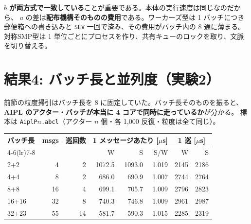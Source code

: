 \documentclass[a4paper,11pt]{ltjsarticle}
\begin{document}
\textbf{$b$ が両方式で一致している}ことが重要である。本体の実行速度は同じなのだから、
$a$ の差は\textbf{配布機構そのものの費用}である。ワーカーズ型は 1 バッチにつき
郵便箱への書き込みと \texttt{SEV} 一回で済み、その費用がバッチ内の 8 通に薄まる。
対称SMP型は 1 単位ごとにプロセスを作り、共有キューのロックを取り、文脈を切り替える。


\section{結果4: バッチ長と並列度（実験2）}\label{sec:exp2}

\begin{center}\end{center}


前節の粒度掃引はバッチ長を 8 に固定していた。バッチ長そのものを振ると、
\textbf{AIPL のアクター・バッチが本当に 4 コアで同時に走っているか}が分かる。
標本は \texttt{AiplP$n$.abcl}（アクター $n$ 個・各 1{,}000 反復・粒度は全て同じ）。

\begin{center}
\begin{tabular}{lrrrrrrr}
\toprule
バッチ長 & msgs & 巡回数 & \multicolumn{3}{c}{1 メッセージあたり [$\mu$s]} & \multicolumn{2}{c}{1 巡 [$\mu$s]} \\
\cmidrule(lr){4-6}\cmidrule(lr){7-8}
 & & & W & S & S/W & W & S \\
\midrule
2+2 & 4 & 2 & 1072.5 & 1093.0 & 1.019 & 2145 & 2186 \\%
4+4 & 8 & 2 & 686.0 & 690.9 & 1.007 & 2744 & 2764 \\%
8+8 & 16 & 4 & 699.1 & 705.7 & 1.009 & 2796 & 2823 \\%
16+16 & 32 & 8 & 740.3 & 746.8 & 1.009 & 2961 & 2987 \\%
32+23 & 55 & 14 & 581.7 & 590.3 & 1.015 & 2285 & 2319 \\
\bottomrule
\end{tabular}
\end{center}
\end{document}
